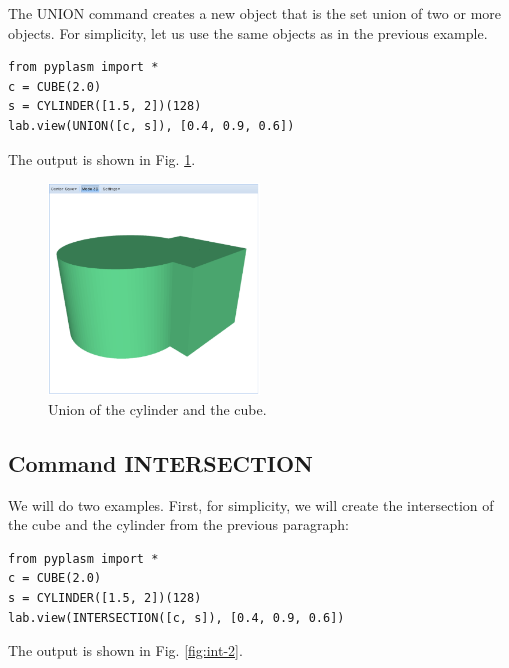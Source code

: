 \documentclass[article,A4,12pt]{llncs}
\begin{document}
The UNION command creates a new object that is the set union 
of two or more objects. For simplicity, let us use the same objects
as in the previous example. 

\begin{verbatim}
from pyplasm import *
c = CUBE(2.0)
s = CYLINDER([1.5, 2])(128)
lab.view(UNION([c, s]), [0.4, 0.9, 0.6]) 
\end{verbatim}
The output is shown in Fig. \ref{fig:union}.


\begin{figure}[!ht]
\begin{center}
\includegraphics[width=0.5\textwidth]{img/union.png}
\end{center}
\vspace{-2mm}
\caption{Union of the cylinder and the cube.}
\label{fig:union}
\end{figure}


\subsection{Command INTERSECTION}

We will do two examples. First, for simplicity, we will create the intersection
of the cube and the cylinder from the previous paragraph:
 
\begin{verbatim}
from pyplasm import *
c = CUBE(2.0)
s = CYLINDER([1.5, 2])(128)
lab.view(INTERSECTION([c, s]), [0.4, 0.9, 0.6]) 
\end{verbatim}
The output is shown in Fig. \ref{fig:int-2}.

\newpage
\end{document}
